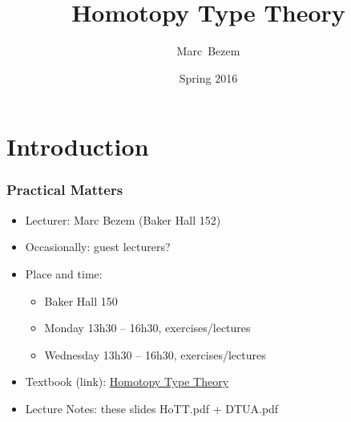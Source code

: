 \documentclass[handout]{beamer}
\title[HoTT]%
{Homotopy Type Theory}
\author[Marc Bezem]{%
  Marc~Bezem\inst{1} %
  }
\institute[University of Bergen]{
  \inst{1}%
  Department of Informatics\\
  Bergen University
  }
\date[INF329]{Spring 2016}
\newcommand{\leaveout}[1]{}
\begin{document}
  \frame
  {
    \titlepage
  }




  \section{Introduction}

  \frame
  {
    
    \frametitle{Practical Matters}

\begin{itemize}
\item<1-> Lecturer: Marc Bezem (Baker Hall 152)
\item<2-> Occasionally: guest lecturers?
\item<3-> Place and time: 
 \begin{itemize}
\item Baker Hall 150
 \item Monday 13h30 -- 16h30, exercises/lectures
 \item Wednesday 13h30 -- 16h30, exercises/lectures
 \end{itemize} 
\item<4-> Textbook (link): \href{ www.homotopytypetheory.org/book}{\color{red}Homotopy Type Theory}
\item<5-> Lecture Notes: these slides HoTT.pdf + DTUA.pdf
\end{itemize}
  }

\leaveout{
  \frame
  {
    
    \frametitle{Exam requirements}

\begin{itemize}
\item<1-> 80\% presence
\item<3-> A short paper, or a relevant verification in Coq 
(f.e., of some material from the textbook).
\item<4-> Fail/pass
\end{itemize}
  }



\frame
  {
    
    \frametitle{Overview}

    \begin{itemize}[<+->]
    \item 11.09: Untyped Lambda Calculus
    \item 18.09: Simple Type Theory
    \item 25.09: No seminar 
        \item 02.10 -- $\infty$: The Book
    \end{itemize}
  }
}
\end{document}
